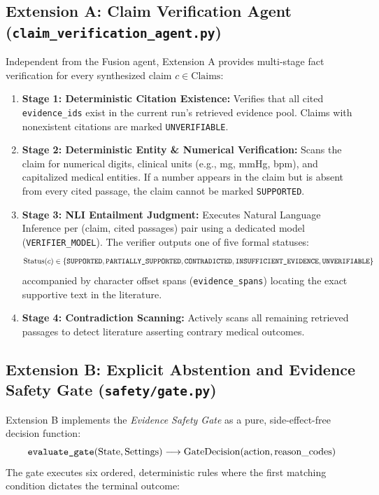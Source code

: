 \documentclass[12pt,a4paper]{report}
\begin{document}
\subsection{Extension A: Claim Verification Agent (\texttt{claim\_verification\_agent.py})}
Independent from the Fusion agent, Extension A provides multi-stage fact verification for every synthesized claim $c \in \text{Claims}$:
\begin{enumerate}
    \item \textbf{Stage 1: Deterministic Citation Existence:} Verifies that all cited \texttt{evidence\_ids} exist in the current run's retrieved evidence pool. Claims with nonexistent citations are marked \texttt{UNVERIFIABLE}.
    \item \textbf{Stage 2: Deterministic Entity \& Numerical Verification:} Scans the claim for numerical digits, clinical units (e.g., mg, mmHg, bpm), and capitalized medical entities. If a number appears in the claim but is absent from every cited passage, the claim cannot be marked \texttt{SUPPORTED}.
    \item \textbf{Stage 3: NLI Entailment Judgment:} Executes Natural Language Inference per (claim, cited passages) pair using a dedicated model (\texttt{VERIFIER\_MODEL}). The verifier outputs one of five formal statuses:
    \begin{equation}
        \text{Status}(c) \in \{\text{\texttt{SUPPORTED}}, \text{\texttt{PARTIALLY\_SUPPORTED}}, \text{\texttt{CONTRADICTED}}, \text{\texttt{INSUFFICIENT\_EVIDENCE}}, \text{\texttt{UNVERIFIABLE}}\}
    \end{equation}
    accompanied by character offset spans (\texttt{evidence\_spans}) locating the exact supportive text in the literature.
    \item \textbf{Stage 4: Contradiction Scanning:} Actively scans all remaining retrieved passages to detect literature asserting contrary medical outcomes.
\end{enumerate}

\subsection{Extension B: Explicit Abstention and Evidence Safety Gate (\texttt{safety/gate.py})}
Extension B implements the \textit{Evidence Safety Gate} as a pure, side-effect-free decision function:
\begin{equation}
    \text{\texttt{evaluate\_gate}}(\text{State}, \text{Settings}) \longrightarrow \text{GateDecision}(\text{action}, \text{reason\_codes})
\end{equation}
The gate executes six ordered, deterministic rules where the first matching condition dictates the terminal outcome:
\end{document}
